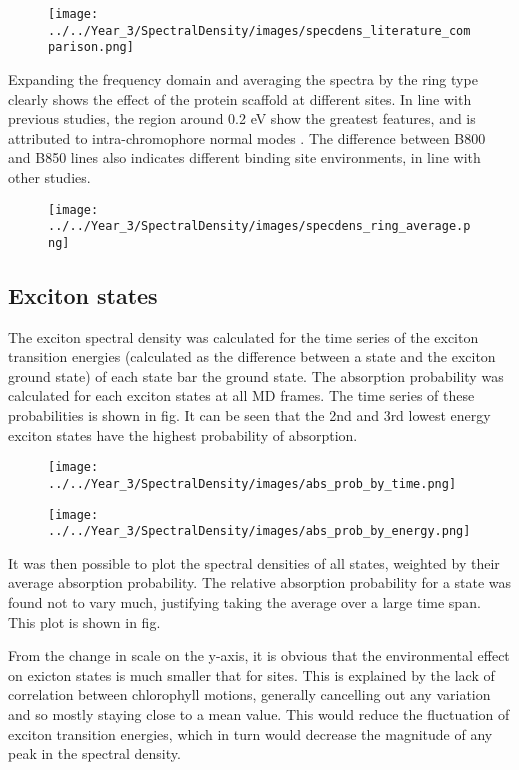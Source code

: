 \begin{figure}
    \centering
    \texttt{[image: ../../Year\_3/SpectralDensity/images/specdens\_literature\_comparison.png]}
\end{figure}

Expanding the frequency domain and averaging the spectra by the ring type clearly
shows the effect of the protein scaffold at different sites. In line with previous
studies, the region around 0.2 eV show the greatest features, and is attributed
to intra-chromophore normal modes \cite{Olbrich2010}. The difference between B800
and B850 lines also indicates different binding site environments, in line with 
other studies.

\begin{figure}
    \texttt{[image: ../../Year\_3/SpectralDensity/images/specdens\_ring\_average.png]}
\end{figure}

\subsection{Exciton states}
\label{subsec:states}

The exciton spectral density was calculated for the time series of the exciton transition
energies (calculated as the difference between a state and the exciton ground state)
of each state bar the ground state. The absorption probability was calculated for
each exciton states at all MD frames. The time series of these probabilities is 
shown in fig. It can be seen that the 2nd and 3rd lowest energy exciton states have
the highest probability of absorption. 

\begin{figure}
    \texttt{[image: ../../Year\_3/SpectralDensity/images/abs\_prob\_by\_time.png]}
\end{figure}

\begin{figure}
    \texttt{[image: ../../Year\_3/SpectralDensity/images/abs\_prob\_by\_energy.png]}
\end{figure}


It was then possible to plot the spectral densities
of all states, weighted by their average absorption probability. The relative absorption 
probability for a state was found not to vary much, justifying taking the average
over a large time span. This plot is shown in fig.

From the change in scale on the y-axis, it is obvious that the environmental effect
on exicton states is much smaller that for sites. This is explained by the lack
of correlation between chlorophyll motions, generally cancelling out any variation
and so mostly staying close to a mean value. This would reduce the fluctuation of
exciton transition energies, which in turn would decrease the magnitude of any peak 
in the spectral density.


